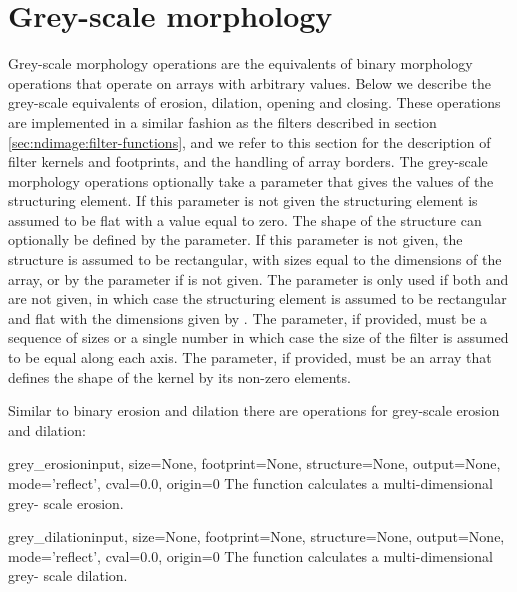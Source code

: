 \section{Grey-scale morphology}
\label{sec:ndimage:grey-morphology}

Grey-scale morphology operations are the equivalents of binary morphology
operations that operate on arrays with arbitrary values. Below we describe 
the grey-scale equivalents of erosion, dilation, opening and closing. These
operations are implemented in a similar fashion as the filters described in
section \ref{sec:ndimage:filter-functions}, and we refer to this section 
for the description of filter kernels and footprints, and the handling of 
array borders. The grey-scale morphology operations optionally take a 
 parameter that gives the values of the structuring element. 
If this parameter is not given the structuring element is assumed to be 
flat with a value equal to zero. The shape of the structure can optionally 
be defined by the  parameter. If this parameter is not 
given, the structure is assumed to be rectangular, with sizes equal to the 
dimensions of the  array, or by the  parameter if 
 is not given. The  parameter is only used if both 
 and  are not given, in which case the 
structuring element is assumed to be rectangular and flat with the 
dimensions given by . The  parameter, if provided, must 
be a sequence of sizes or a single number in which case the size of the 
filter is assumed to be equal along each axis. The  
parameter, if provided, must be an array that defines the shape of the 
kernel by its non-zero elements.

Similar to binary erosion and dilation there are operations for grey-scale
erosion and dilation:

\begin{funcdesc}{grey_erosion}{input, size=None, footprint=None, 
    structure=None, output=None, mode='reflect', cval=0.0, origin=0} The
   function calculates a multi-dimensional grey-
  scale erosion.
\end{funcdesc}

\begin{funcdesc}{grey_dilation}{input, size=None, footprint=None, 
    structure=None, output=None, mode='reflect', cval=0.0, origin=0} The
   function calculates a multi-dimensional grey-
  scale dilation.
\end{funcdesc}

